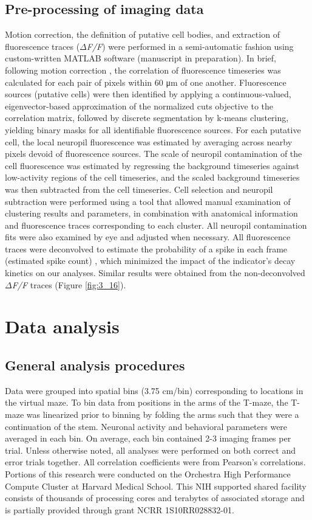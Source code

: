 \subsection{Pre-processing of imaging data} \label{methods:preprocessing}
Motion correction, the definition of putative cell bodies, and extraction of fluorescence traces (\textit{$\Delta$F/F}) were performed in a semi-automatic fashion using custom-written MATLAB software (manuscript in preparation). In brief, following motion correction \citep{Greenberg:2009gn}, the correlation of fluorescence timeseries was calculated for each pair of pixels within 60 μm of one another. Fluorescence sources (putative cells) were then identified by applying a continuous-valued, eigenvector-based approximation of the normalized cuts objective \citep{Shi:2000gf} to the correlation matrix, followed by discrete segmentation by k-means clustering, yielding binary masks for all identifiable fluorescence sources. For each putative cell, the local neuropil fluorescence was estimated by averaging across nearby pixels devoid of fluorescence sources. The scale of neuropil contamination of the cell fluorescence was estimated by regressing the background timeseries against low-activity regions of the cell timeseries, and the scaled background timeseries was then subtracted from the cell timeseries. Cell selection and neuropil subtraction were performed using a tool that allowed manual examination of clustering results and parameters, in combination with anatomical information and fluorescence traces corresponding to each cluster. All neuropil contamination fits were also examined by eye and adjusted when necessary. All fluorescence traces were deconvolved to estimate the probability of a spike in each frame (estimated spike count) \citep{Vogelstein:2010jl}, which minimized the impact of the indicator’s decay kinetics on our analyses. Similar results were obtained from the non-deconvolved \textit{$\Delta$F/F} traces (Figure \ref{fig:3_16}).

\section{Data analysis} \label{methods:data_anal}
\subsection{General analysis procedures} \label{methods:general_anal}
Data were grouped into spatial bins (3.75 cm/bin) corresponding to locations in the virtual maze. To bin data from positions in the arms of the T-maze, the T-maze was linearized prior to binning by folding the arms such that they were a continuation of the stem. Neuronal activity and behavioral parameters were averaged in each bin. On average, each bin contained 2-3 imaging frames per trial. Unless otherwise noted, all analyses were performed on both correct and error trials together. All correlation coefficients were from Pearson’s correlations. Portions of this research were conducted on the Orchestra High Performance Compute Cluster at Harvard Medical School. This NIH supported shared facility consists of thousands of processing cores and terabytes of associated storage and is partially provided through grant NCRR 1S10RR028832-01.

